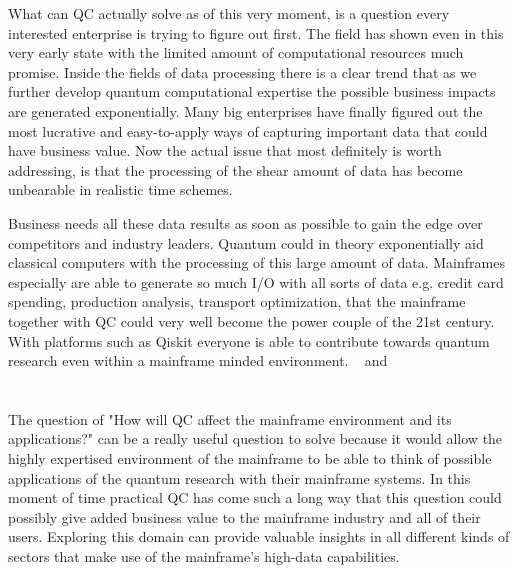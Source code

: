 What can QC actually solve as of this very moment, is a question every interested enterprise is trying to figure out first. The field has shown even in this very early state with the limited amount of computational resources much promise. Inside the fields of data processing there is a clear trend that as we further develop quantum computational expertise the possible business impacts are generated exponentially. Many big enterprises have finally figured out the most lucrative and easy-to-apply ways of capturing important data that could have business value. Now the actual issue that most definitely is worth addressing, is that the processing of the shear amount of data has become unbearable in realistic time schemes.\autocite{Rieffel1998}

Business needs all these data results as soon as possible to gain the edge over competitors and industry leaders. Quantum could in theory exponentially aid classical computers with the processing of this large amount of data. Mainframes especially are able to generate so much I/O with all sorts of data e.g. credit card spending, production analysis, transport optimization, that the mainframe together with QC could very well become the power couple of the 21st century. With platforms such as Qiskit everyone is able to contribute towards quantum research even within a mainframe minded environment.  ~\autocite{Qiskit} and ~\autocite{Cirq}

\section{}
\label{sec:onderzoeksvraag}

The question of "How will QC affect the mainframe environment and its applications?" can be a really useful question to solve because it would allow the highly expertised environment of the mainframe to be able to think of possible applications of the quantum research with their mainframe systems. In this moment of time practical QC has come such a long way that this question could possibly give added business value to the mainframe industry and all of their users. Exploring this domain can provide valuable insights in all different kinds of sectors that make use of the mainframe's high-data capabilities.

\section{}
\label{sec:onderzoeksdoelstelling}

